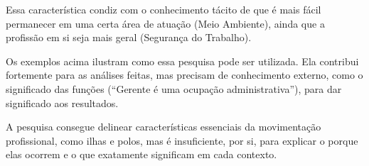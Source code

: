 \documentclass[12pt,a4paper]{article}
\begin{document}
Essa característica condiz com o conhecimento tácito de que é mais fácil permanecer em uma certa área de atuação (Meio Ambiente), ainda que a profissão em si seja mais geral (Segurança do Trabalho).

Os exemplos acima ilustram como essa pesquisa pode ser utilizada. Ela contribui fortemente para as análises feitas, mas precisam de conhecimento externo, como o significado das funções (\enquote{Gerente é uma ocupação administrativa}), para dar significado aos resultados.

A pesquisa consegue delinear características essenciais da movimentação profissional, como ilhas e polos, mas é insuficiente, por si, para explicar o porque elas ocorrem e o que exatamente significam em cada contexto.

\begin{figure}[ht]
    \centering
    \\    
\end{figure}
\end{document}
